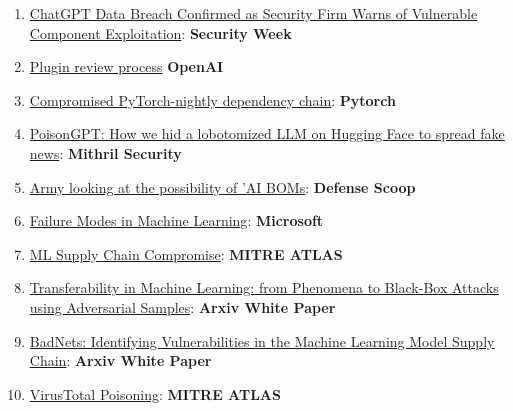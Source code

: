 \documentclass[
]{article}
\providecommand{\tightlist}{%
  \setlength{\itemsep}{0pt}\setlength{\parskip}{0pt}}
\begin{document}
\begin{enumerate}
\def\labelenumi{\arabic{enumi}.}
\tightlist
\item
  \href{https://www.securityweek.com/chatgpt-data-breach-confirmed-as-security-firm-warns-of-vulnerable-component-exploitation/}{ChatGPT
  Data Breach Confirmed as Security Firm Warns of Vulnerable Component
  Exploitation}: \textbf{Security Week}
\item
  \href{https://platform.openai.com/docs/plugins/review}{Plugin review
  process} \textbf{OpenAI}
\item
  \href{https://pytorch.org/blog/compromised-nightly-dependency/}{Compromised
  PyTorch-nightly dependency chain}: \textbf{Pytorch}
\item
  \href{https://blog.mithrilsecurity.io/poisongpt-how-we-hid-a-lobotomized-llm-on-hugging-face-to-spread-fake-news/}{PoisonGPT:
  How we hid a lobotomized LLM on Hugging Face to spread fake news}:
  \textbf{Mithril Security}
\item
  \href{https://defensescoop.com/2023/05/25/army-looking-at-the-possibility-of-ai-boms-bill-of-materials/}{Army
  looking at the possibility of 'AI BOMs}: \textbf{Defense Scoop}
\item
  \href{https://learn.microsoft.com/en-us/security/engineering/failure-modes-in-machine-learning}{Failure
  Modes in Machine Learning}: \textbf{Microsoft}
\item
  \href{https://atlas.mitre.org/techniques/AML.T0010/}{ML Supply Chain
  Compromise}: \textbf{MITRE ATLAS}
\item
  \href{https://arxiv.org/pdf/1605.07277.pdf}{Transferability in Machine
  Learning: from Phenomena to Black-Box Attacks using Adversarial
  Samples}: \textbf{Arxiv White Paper}
\item
  \href{https://arxiv.org/abs/1708.06733}{BadNets: Identifying
  Vulnerabilities in the Machine Learning Model Supply Chain}:
  \textbf{Arxiv White Paper}
\item
  \href{https://atlas.mitre.org/studies/AML.CS0002}{VirusTotal
  Poisoning}: \textbf{MITRE ATLAS}
\end{enumerate}
\end{document}
